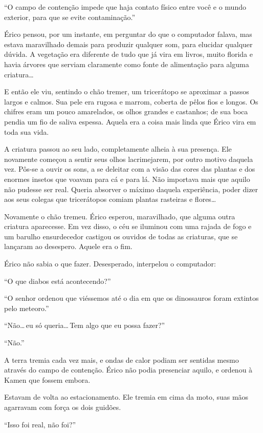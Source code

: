 “O campo de contenção impede que haja contato físico entre você e o
mundo exterior, para que se evite contaminação.”

Érico pensou, por um instante, em perguntar do que o computador falava,
mas estava maravilhado demais para produzir qualquer som, para elucidar
qualquer dúvida. A vegetação era diferente de tudo que já vira em
livros, muito florida e havia árvores que serviam claramente como fonte
de alimentação para alguma criatura\ldots

E então ele viu, sentindo o chão tremer, um tricerátopo se aproximar a
passos largos e calmos. Sua pele era rugosa e marrom, coberta de pêlos
fios e longos. Os chifres eram um pouco amarelados, os olhos grandes e
castanhos; de sua boca pendia um fio de saliva espessa. Aquela era a
coisa mais linda que Érico vira em toda sua vida.

A criatura passou ao seu lado, completamente alheia à sua presença. Ele
novamente começou a sentir seus olhos lacrimejarem, por outro motivo
daquela vez. Pôs-se a ouvir os sons, a se deleitar com a visão das cores
das plantas e dos enormes insetos que voavam para cá e para lá. Não
importava mais que aquilo não pudesse ser real. Queria absorver o máximo
daquela experiência, poder dizer aos seus colegas que tricerátopos
comiam plantas rasteiras e flores\ldots

Novamente o chão tremeu. Érico esperou, maravilhado, que alguma outra
criatura aparecesse. Em vez disso, o céu se iluminou com uma rajada de
fogo e um barulho ensurdecedor castigou os ouvidos de todas as
criaturas, que se lançaram ao desespero. Aquele era o fim.

Érico não sabia o que fazer. Desesperado, interpelou o computador:

“O que diabos está acontecendo?”

“O senhor ordenou que viéssemos até o dia em que os dinossauros foram
extintos pelo meteoro.”

“Não\ldots\,eu só queria\ldots\,Tem algo que eu possa fazer?”

“Não.”

A terra tremia cada vez mais, e ondas de calor podiam ser sentidas mesmo
através do campo de contenção. Érico não podia presenciar aquilo, e
ordenou à Kamen que fossem embora.

Estavam de volta ao estacionamento. Ele tremia em cima da moto, suas
mãos agarravam com força os dois guidões.

“Isso foi real, não foi?”

